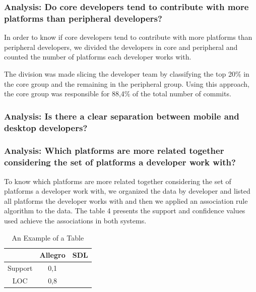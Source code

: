 \documentclass[10pt, conference]{IEEEtran}
\begin{document}
\subsubsection{Analysis: Do core developers tend to contribute with more platforms than peripheral developers?}
\label{met_analysis1}

In order to know if core developers tend to contribute with more platforms than peripheral developers, we divided the developers in core and peripheral and counted the number of platforms each developer works with. 

The division was made slicing the developer team by classifying the top 20\% in the core group and the remaining in the peripheral group. Using this approach, the core group was responsible for 88,4\% of the total number of commits.

 





\subsubsection{Analysis: Is there a clear separation between mobile and desktop developers?}








\subsubsection{Analysis: Which platforms are more related together considering the set of platforms a developer work with? }

To know which platforms are more related together considering the set of platforms a developer work with, we organized the data by developer and listed all platforms the developer works with and then we applied an association rule algorithm to the data. The table 4 presents the support and confidence values used achieve the associations in both systems. 

\begin{table}[h]
\renewcommand{\arraystretch}{1.3}
\caption{An Example of a Table}
\label{table_example2}
\centering
\begin{tabular}{|c|c|c|}
\hline
 & Allegro & SDL\\
\hline
Support & 0,1 & \\
\hline
LOC & 0,8 & \\
\hline
\end{tabular}
\end{table}
\end{document}
